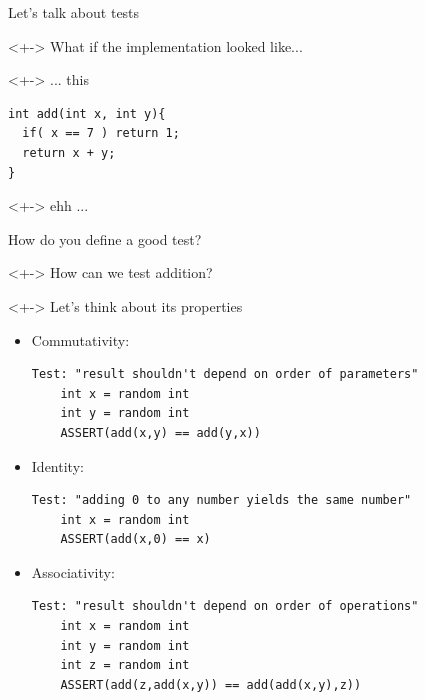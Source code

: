 \documentclass{beamer}
\begin{document}
\begin{frame}[fragile]{Let's talk about tests}

\begin{uncoverenv}<+->
What if the implementation looked like...
\end{uncoverenv}

\begin{uncoverenv}<+->
... this
\begin{lstlisting}[style=cpp]
int add(int x, int y){
  if( x == 7 ) return 1;
  return x + y;
}
\end{lstlisting}
\end{uncoverenv}

\begin{uncoverenv}<+->
ehh ...
\end{uncoverenv}

\end{frame}


\begin{frame}[fragile]{How do you define a good test?}

\begin{uncoverenv}<+->
How can we test addition?
\end{uncoverenv}

\begin{uncoverenv}<+->
Let's think about its properties
\end{uncoverenv}

\begin{itemize}[<+->]

\item Commutativity:
\begin{lstlisting}[style=cpp]
Test: "result shouldn't depend on order of parameters"
    int x = random int
    int y = random int
    ASSERT(add(x,y) == add(y,x))
\end{lstlisting}

\item Identity:
\begin{lstlisting}[style=cpp]
Test: "adding 0 to any number yields the same number"
    int x = random int
    ASSERT(add(x,0) == x)
\end{lstlisting}

\item Associativity:
\begin{lstlisting}[style=cpp]
Test: "result shouldn't depend on order of operations"
    int x = random int
    int y = random int
    int z = random int
    ASSERT(add(z,add(x,y)) == add(add(x,y),z))
\end{lstlisting}

\end{itemize}

\end{frame}
\end{document}
